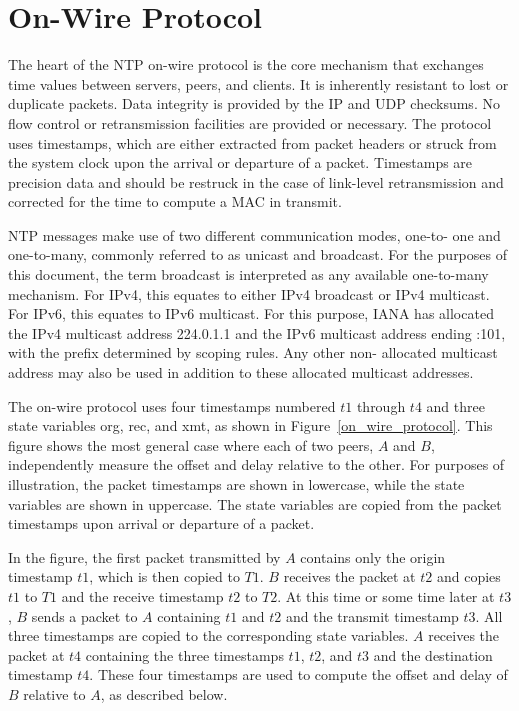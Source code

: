 \chapter{On-Wire Protocol}
\label{section-8}

The heart of the NTP on-wire protocol is the core mechanism that
exchanges time values between servers, peers, and clients. It is
inherently resistant to lost or duplicate packets. Data integrity is
provided by the IP and UDP checksums. No flow control or
retransmission facilities are provided or necessary. The protocol
uses timestamps, which are either extracted from packet headers or
struck from the system clock upon the arrival or departure of a
packet. Timestamps are precision data and should be restruck in the
case of link-level retransmission and corrected for the time to
compute a MAC in transmit.

NTP messages make use of two different communication modes, one-to-
one and one-to-many, commonly referred to as unicast and broadcast.
For the purposes of this document, the term broadcast is interpreted
as any available one-to-many mechanism. For IPv4, this equates to
either IPv4 broadcast or IPv4 multicast. For IPv6, this equates to
IPv6 multicast. For this purpose, IANA has allocated the IPv4
multicast address 224.0.1.1 and the IPv6 multicast address ending
:101, with the prefix determined by scoping rules. Any other non-
allocated multicast address may also be used in addition to these
allocated multicast addresses.

The on-wire protocol uses four timestamps numbered $ t1 $ through $ t4 $ and
three state variables org, rec, and xmt, as shown in Figure~\ref{on_wire_protocol}. This
figure shows the most general case where each of two peers, $ A $ and $ B $,
independently measure the offset and delay relative to the other.
For purposes of illustration, the packet timestamps are shown in
lowercase, while the state variables are shown in uppercase. The
state variables are copied from the packet timestamps upon arrival or
departure of a packet.


In the figure, the first packet transmitted by $ A $ contains only the
origin timestamp $ t1 $, which is then copied to $ T1 $. $ B $ receives the
packet at $ t2 $ and copies $ t1 $ to $ T1 $ and the receive timestamp $ t2 $ to $ T2 $.
At this time or some time later at $ t3 $, $ B $ sends a packet to $ A $
containing $ t1 $ and $ t2 $ and the transmit timestamp $ t3 $. All three
timestamps are copied to the corresponding state variables. $ A $
receives the packet at $ t4 $ containing the three timestamps $ t1 $, $ t2 $, and
$ t3 $ and the destination timestamp $ t4 $. These four timestamps are used
to compute the offset and delay of $ B $ relative to $ A $, as described
below.

